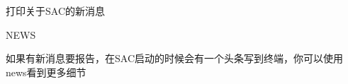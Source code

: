 \label{cmd:news}

打印关于SAC的新消息

\begin{SACSTX}
NEWS
\end{SACSTX}

如果有新消息要报告，在SAC启动的时候会有一个头条写到终端，你可以使用news看到更多细节

